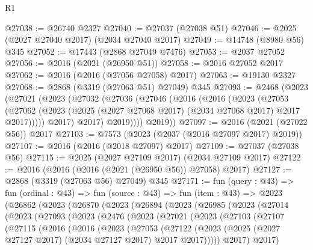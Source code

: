 \begin{lexlean}{R1}
\begin{coremodule}
@27038 := @26740 @2327
@27040 := @27037 (@27038 @51)
@27046 := @2025 (@2027 @27040 @2017) (@2034 @27040 @2017)
@27049 := @14748 (@8980 @56) @345
@27052 := @17443 (@2868 @27049 @7476)
@27053 := @2037 @27052
@27056 := @2016 (@2021 (@26950 @51))
@27058 := @2016 @27052 @2017
@27062 := @2016 (@2016 (@27056 @27058) @2017)
@27063 := @19130 @2327
@27068 := @2868 (@3319 (@27063 @51) @27049) @345
@27093 := @2468
    (@2023
      (@27021
        (@2023
          (@27032
            (@27036
              (@27046
                (@2016
                  (@2016
                    (@2023
                      (@27053
                        (@27062
                          (@2023 (@2025 (@2027 @27068 @2017) (@2034 @27068 @2017) @2017 @2017)))))
                    @2017)
                  @2017)
                @2019))))
        @2019))
@27097 := @2016 (@2021 (@27022 @56)) @2017
@27103 := @7573 (@2023 (@2037 (@2016 @27097 @2017) @2019))
@27107 := @2016 (@2016 (@2018 @27097) @2017)
@27109 := @27037 (@27038 @56)
@27115 := @2025 (@2027 @27109 @2017) (@2034 @27109 @2017)
@27122 := @2016 (@2016 (@2016 (@2021 (@26950 @56)) @27058) @2017)
@27127 := @2868 (@3319 (@27063 @56) @27049) @345
@27171 := fun (query : @43) =>
  fun (ordinal : @43) =>
  fun (source : @43) =>
  fun (item : @43) =>
  @2023
    (@26862
      (@2023
        (@26870
          (@2023
            (@26894
              (@2023
                (@26985
                  (@2023
                    (@27014
                      (@2023
                        (@27093
                          (@2023
                            (@2476
                              (@2023
                                (@27021
                                  (@2023
                                    (@27103
                                      (@27107
                                        (@27115
                                          (@2016
                                            (@2016
                                              (@2023
                                                (@27053
                                                  (@27122
                                                    (@2023
                                                      (@2025
                                                        (@2027 @27127 @2017)
                                                        (@2034 @27127 @2017)
                                                        @2017
                                                        @2017)))))
                                              @2017)
                                            @2017)

\end{coremodule}
\end{lexlean}
